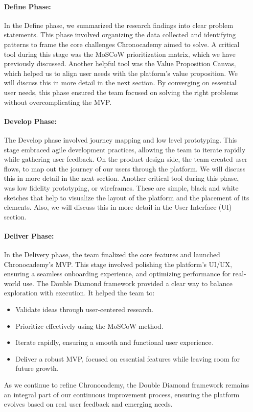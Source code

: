 \paragraph{Define Phase:}
In the Define phase, we summarized the research findings into clear problem statements.
This phase involved organizing the data collected and identifying patterns to frame the core challenges Chronocademy aimed to solve.
A critical tool during this stage was the MoSCoW prioritization matrix, which we have previously discussed.
Another helpful tool was the Value Proposition Canvas, which helped us to align user needs with the platform's value proposition.
We will discuss this in more detail in the next section.
By converging on essential user needs, this phase ensured the team focused on solving the right problems without overcomplicating the MVP\@.\newline

\paragraph{Develop Phase:}
The Develop phase involved journey mapping and low level prototyping.
This stage embraced agile development practices, allowing the team to iterate rapidly while gathering user feedback.
On the product design side, the team created user flows, to map out the journey of our users through the platform.
We will discuss this in more detail in the next section.\newline
Another critical tool during this phase, was low fidelity prototyping, or wireframes.
These are simple, black and white sketches that help to visualize the layout of the platform and the placement of its elements.
Also, we will discuss this in more detail in the User Interface (UI) section.\newline

\paragraph{Deliver Phase:}
In the Delivery phase, the team finalized the core features and launched Chronocademy's MVP. This stage involved polishing the platform’s UI/UX, ensuring a seamless onboarding experience, and optimizing performance for real-world use.
The Double Diamond framework provided a clear way to balance exploration with execution.
It helped the team to:
\begin{itemize}
    \item Validate ideas through user-centered research.
    \item Prioritize effectively using the MoSCoW method.
    \item Iterate rapidly, ensuring a smooth and functional user experience.
    \item Deliver a robust MVP, focused on essential features while leaving room for future growth.
\end{itemize}
As we continue to refine Chronocademy, the Double Diamond framework remains an integral part of our continuous improvement process, ensuring the platform evolves based on real user feedback and emerging needs.
\clearpage

